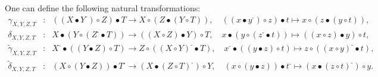 \documentclass[nosumlimits,twoside]{amsart}
\theoremstyle{definition}
\theoremstyle{remark}
\def\revsn{\text{-}}
\begin{document}
One can define the following natural transformations:%
\begin{eqnarray*}
\gamma _{X,Y,Z,T} &:&\left( \left( X\bullet Y^{\revsn }\right) \circ Z\right)
\bullet T\rightarrow X\circ \left( Z\bullet \left( Y\circ T\right) \right)
,\quad \left( \left( x\bullet y^{\revsn }\right) \circ z\right) \bullet
t\mapsto x\circ \left( z\bullet \left( y\circ t\right) \right) , \\
\delta _{X,Y,Z,T} &:&X\bullet \left( Y\circ \left( Z^{\revsn }\bullet T\right)
\right) \rightarrow \left( \left( X\circ Z\right) \bullet Y\right) \circ
T,\quad x\bullet \left( y\circ \left( z^{\revsn }\bullet t\right) \right)
\mapsto \left( \left( x\circ z\right) \bullet y\right) \circ t,\\
\widetilde{\gamma }_{X,Y,Z,T} &:&X^{\revsn }\bullet \left( \left( Y\bullet
Z\right) \circ T\right) \rightarrow Z\circ \left( \left( X\circ Y\right)
^{\revsn }\bullet T\right) ,\quad x^{\revsn }\bullet \left( \left( y\bullet
z\right) \circ t\right) \mapsto z\circ \left( \left( x\circ y\right) ^{\revsn
}\bullet t\right),  \\
\widetilde{\delta }_{X,Y,Z,T} &:&\left( X\circ \left( Y\bullet Z\right)
\right) \bullet T^{\revsn }\rightarrow \left( X\bullet \left( Z\circ T\right)
^{\revsn }\right) \circ Y,\quad \left( x\circ \left( y\bullet z\right)
\right) \bullet t^{\revsn }\mapsto \left( x\bullet \left( z\circ t\right)
^{\revsn }\right) \circ y.
\end{eqnarray*}
%
\end{document}
